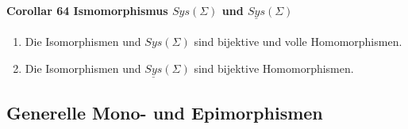 \paragraph{Corollar 64 Ismomorphismus $Sys(\Sigma)$ und $\underline{Sys}(\Sigma)$ }
\begin{enumerate}
\item Die Isomorphismen und $Sys(\Sigma)$ sind bijektive und volle Homomorphismen.
\item Die Isomorphismen und $\underline{Sys}(\Sigma)$ sind bijektive Homomorphismen.
\end{enumerate}

\subsection{Generelle Mono- und Epimorphismen}

